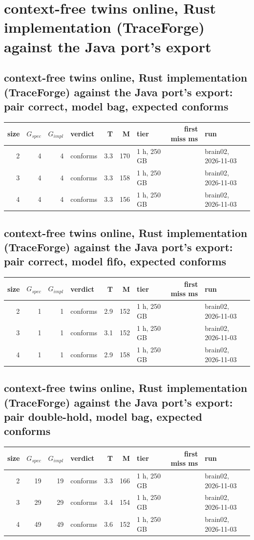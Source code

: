 \documentclass[10pt]{article}
\begin{document}
\section*{context-free twins online, Rust implementation (TraceForge) against the Java port's export}
\subsection*{context-free twins online, Rust implementation (TraceForge) against the Java port's export: pair \textsf{correct}, model bag, expected conforms}
\begin{longtable}{@{}rrrlrrlrl@{}}
\toprule
size & $G_{\mathit{spec}}$ & $G_{\mathit{impl}}$ & verdict & T & M & tier & first miss ms & run \\
\midrule
\endhead
\color{red} 2 & 4 & 4 & conforms & 3.3 & 170 & 1 h, 250 GB &  & brain02, 2026-11-03 \\
\color{red} 3 & 4 & 4 & conforms & 3.3 & 158 & 1 h, 250 GB &  & brain02, 2026-11-03 \\
\color{red} 4 & 4 & 4 & conforms & 3.3 & 156 & 1 h, 250 GB &  & brain02, 2026-11-03 \\
\bottomrule
\end{longtable}
\subsection*{context-free twins online, Rust implementation (TraceForge) against the Java port's export: pair \textsf{correct}, model fifo, expected conforms}
\begin{longtable}{@{}rrrlrrlrl@{}}
\toprule
size & $G_{\mathit{spec}}$ & $G_{\mathit{impl}}$ & verdict & T & M & tier & first miss ms & run \\
\midrule
\endhead
\color{red} 2 & 1 & 1 & conforms & 2.9 & 152 & 1 h, 250 GB &  & brain02, 2026-11-03 \\
\color{red} 3 & 1 & 1 & conforms & 3.1 & 152 & 1 h, 250 GB &  & brain02, 2026-11-03 \\
\color{red} 4 & 1 & 1 & conforms & 2.9 & 158 & 1 h, 250 GB &  & brain02, 2026-11-03 \\
\bottomrule
\end{longtable}
\subsection*{context-free twins online, Rust implementation (TraceForge) against the Java port's export: pair \textsf{double-hold}, model bag, expected conforms}
\begin{longtable}{@{}rrrlrrlrl@{}}
\toprule
size & $G_{\mathit{spec}}$ & $G_{\mathit{impl}}$ & verdict & T & M & tier & first miss ms & run \\
\midrule
\endhead
\color{red} 2 & 19 & 19 & conforms & 3.3 & 166 & 1 h, 250 GB &  & brain02, 2026-11-03 \\
\color{red} 3 & 29 & 29 & conforms & 3.4 & 154 & 1 h, 250 GB &  & brain02, 2026-11-03 \\
\color{red} 4 & 49 & 49 & conforms & 3.6 & 152 & 1 h, 250 GB &  & brain02, 2026-11-03 \\
\bottomrule
\end{longtable}
\end{document}
